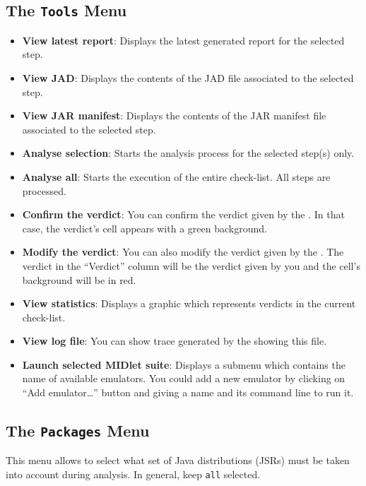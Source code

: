\subsection{The \texttt{Tools} Menu}
\begin{itemize}
\item{\textbf{View latest report}}: Displays the latest generated report for
the selected step.
\item{\textbf{View JAD}}: Displays the contents of the JAD file associated
to the selected step.
\item{\textbf{View JAR manifest}}: Displays the contents of the JAR manifest 
file associated to the selected step.
\item{\textbf{Analyse selection}}: Starts the analysis process for
the selected step(s) only. 
\item{\textbf{Analyse all}}: Starts the execution of the entire
check-list. All steps are processed.
\item{\textbf{Confirm the verdict}}: You can confirm the verdict given by the
\ma. In that case, the verdict's cell appears with a green background.
\item{\textbf{Modify the verdict}}: You can also modify the verdict given by the
\ma. The verdict in the ``Verdict'' column will be the verdict given by you and
the cell's background will be in red.
\item{\textbf{View statistics}}: Displays a graphic which represents verdicts in
the current check-list.
\item{\textbf{View log file}}: You can show trace generated by the \ma showing
this file.
\item{\textbf{Launch selected MIDlet suite}}: Displays a submenu which contains
the name of available emulators. You could add a new emulator by clicking on
``Add emulator\ldots'' button and giving a name and its command line to run it.
\end{itemize}

\subsection{The \texttt{Packages} Menu}
This menu allows to select what set of Java distributions (JSRs) must be taken
into account during analysis. In general, keep \texttt{all} selected.

